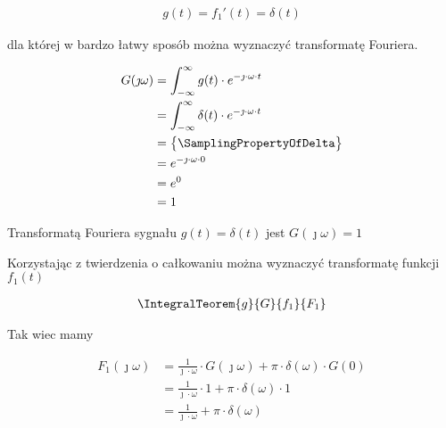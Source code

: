 \begin{task}
\begin{align*}
g(t) = f_1'(t) = \delta(t)
\end{align*}

\begin{figure}[H]
  \centering
\end{figure}

dla której w bardzo łatwy sposób można wyznaczyć transformatę Fouriera.

\begin{align*}
G(\jmath \omega) &= \int_{-\infty}^{\infty} g(t) \cdot e^{-\jmath \cdot \omega \cdot t}\\
&=\int_{-\infty}^{\infty} \delta(t) \cdot e^{-\jmath \cdot \omega \cdot t}\\
&=\begin{Bmatrix}
\SamplingPropertyOfDelta
\end{Bmatrix}\\
&=e^{-\jmath \cdot \omega \cdot 0}\\
&=e^{0}\\
&=1
\end{align*}

Transformatą Fouriera sygnału $g(t)=\delta(t)$ jest $G(\jmath \omega)=1$

Korzystając z twierdzenia o całkowaniu można wyznaczyć transformatę funkcji $f_1(t)$

\begin{align*}
\IntegralTeorem{g}{G}{f_1}{F_1}
\end{align*}

Tak wiec mamy

\begin{align*}
F_1(\jmath \omega)&=\frac{1}{\jmath \cdot \omega } \cdot G(\jmath \omega) + \pi \cdot \delta(\omega) \cdot G(0)\\
&=\frac{1}{\jmath \cdot \omega } \cdot 1 + \pi \cdot \delta(\omega) \cdot 1\\
&=\frac{1}{\jmath \cdot \omega } + \pi \cdot \delta(\omega)\\
\end{align*}


\end{task}
